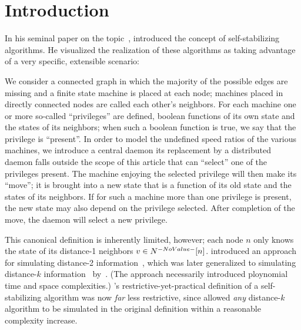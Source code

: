 \section{Introduction}
\label{sec:introduction}
\done{}
In his seminal paper on the topic~\autocite{Dijkstra:1974:SSS:361179.361202},
  \citeauthor{Dijkstra:1974:SSS:361179.361202} introduced the concept of self-stabilizing algorithms.
He visualized the realization of these algorithms as taking advantage of
  a very specific, extensible scenario:
\begin{displayquote}
  We consider a connected graph in which
    the majority of the possible edges are missing and
    a finite state machine is placed at each node;
    machines placed in directly connected nodes are called each other's neighbors.
  For each machine one or more so-called \enquote{privileges} are defined,
    \ie boolean functions of its own state and the states of its neighbors;
    when such a boolean function is true,
    we say that the privilege is \enquote{present}.
  In order to model the undefined speed ratios of the various machines,
    we introduce a central daemon \Dash
    its replacement by a distributed daemon falls outside the scope of this article \Dash
    that can \enquote{select} one of the privileges present.
  The machine enjoying the selected privilege will then make its \enquote{move};
    \ie it is brought into a new state that is a function of
    its old state and the states of its neighbors.
  If for such a machine more than one privilege is present,
    the new state may also depend on the privilege selected.
  After completion of the move, the daemon will select a new privilege.
\end{displayquote}
This canonical definition is inherently limited, however;
  each node $n$ only knows the state of its distance-1 neighbors $v \in \ClosedNeighborhood{n}$.
\citeauthor{gairing:distance-2} introduced an approach for simulating distance-2 information~\autocite{gairing:distance-2},
  which was later generalized to simulating distance-$k$ information~\autocite{goddard:ssa--k-distance} by~\citeauthor{goddard:ssa--k-distance}.
  (The approach necessarily introduced ploynomial time and space complexities.)
\citeauthor{Dijkstra:1974:SSS:361179.361202}'s restrictive-yet-practical definition of a self-stabilizing algorithm
  was now \emph{far} less restrictive,
  since \citeauthor{goddard:ssa--k-distance} allowed \emph{any} distance-$k$ algorithm
  to be simulated in the original definition within a reasonable complexity increase.

